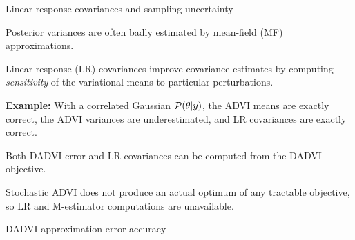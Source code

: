 \begin{frame}{Linear response covariances and sampling uncertainty}
    \pause
    
    \hrulefill
    
    
    Posterior variances are often badly estimated by mean-field (MF) approximations.
    
    Linear response (LR) covariances improve covariance estimates by computing
    \textit{sensitivity} of the variational means to 
    particular perturbations.  \citep{giordano:2018:covariances}
    
    \textbf{Example: } With a correlated Gaussian $\mathcal{P}(\theta \vert y)$,
    the ADVI means are exactly correct, the ADVI variances are underestimated,
    and LR covariances are exactly correct.
    
    \pause
    
    \hrulefill
    
    Both DADVI error and LR covariances can be computed from the DADVI objective.
    
    Stochastic ADVI does not produce an actual optimum of any tractable
    objective, so LR and M-estimator computations are unavailable.
    
    \end{frame}
    
    
    
    
    
    \begin{frame}{DADVI approximation error accuracy}
        \CoverageHistogram{}
    \end{frame}
    
    

    

